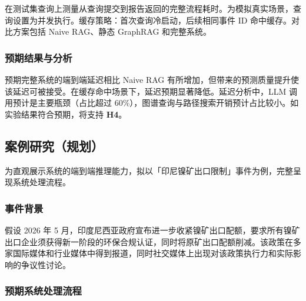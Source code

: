 在测试集查询上测量从查询提交到报告返回的完整流程耗时。为模拟真实场景，查询设置为并发执行。缓存策略：首次查询冷启动，后续相同事件 ID 命中缓存。对比方案包括 Naive RAG、静态 GraphRAG 和\projectshort 完整系统。

\subsubsection{预期结果与分析}

预期\projectshort 完整系统的端到端延迟相比 Naive RAG 有所增加，但带来的预测质量提升使该延迟可被接受。在缓存命中场景下，延迟预期显著降低。延迟分析中，LLM 调用预计是主要瓶颈（占比超过 60\%），图谱查询与路径搜索开销预计占比较小。如实验结果符合预期，将支持 \textbf{H4}。

\subsection{案例研究（规划）}
\label{sec:exp-casestudy}

为直观展示\projectshort 系统的端到端推理能力，拟以「印尼镍矿出口限制」事件为例，完整呈现系统处理流程。

\subsubsection{事件背景}

假设 2026 年 5 月，印度尼西亚政府宣布进一步收紧镍矿出口配额，要求所有镍矿出口企业须获得新一阶段的环保合规认证，同时将原矿出口配额削减。该政策在多家国际媒体和行业媒体中得到报道，同时社交媒体上出现对该政策执行力和实际影响的争议性讨论。

\subsubsection{预期系统处理流程}

